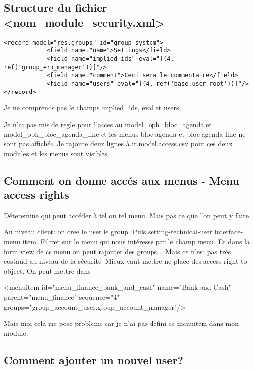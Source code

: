 \documentclass[12pt,a4paper]{article}
\begin{document}
\subsection{Structure du fichier <nom\_module\_security.xml>}
\label{sec:securtity.xml}

\begin{verbatim}
<record model="res.groups" id="group_system">
            <field name="name">Settings</field>
            <field name="implied_ids" eval="[(4, ref('group_erp_manager'))]"/>
            <field name="comment">Ceci sera le commentaire</field>
            <field name="users" eval="[(4, ref('base.user_root'))]"/>
</record>
\end{verbatim}

Je ne comprends pas le champs implied\_ids,  eval et users,

Je n'ai pas mis de regle pour l'acces au model\_oph\_bloc\_agenda et model\_oph\_bloc\_agenda\_line et les menus bloc agenda et bloc agenda line ne sont pas affichés. Je rajoute deux lignes à ir.model.access.csv pour ces deux modules et les menus sont visibles. 

\subsection{Comment on donne accés aux menus - Menu access rights}
\label{sec:menu_access}

Déteremine qui peut accéder à tel ou tel menu. Mais pas ce que l'on peut y faire. 

Au niveau client: on crée le user le group. Puis setting-technical-user interface-menu item. Filtrer sur le menu qui nous intéresse par le champ menu. Et dans la form view de ce menu on peut rajouter des groups. . Mais ce n'est pas très costaud au niveau de la sécurité. Mieux vaut mettre ne place des access right to object.
On peut mettre dans 

<menuitem id="menu\_finance\_bank\_and\_cash" name="Bank and Cash" parent="menu\_finance" sequence="4"
            groups="group\_account\_user,group\_account\_manager"/>

Mais moi cela me pose probleme car je n'ai pas defini ce menuitem dans mon module.


\subsection{Comment ajouter un nouvel user?}
\label{sec:new_user}
\end{document}
